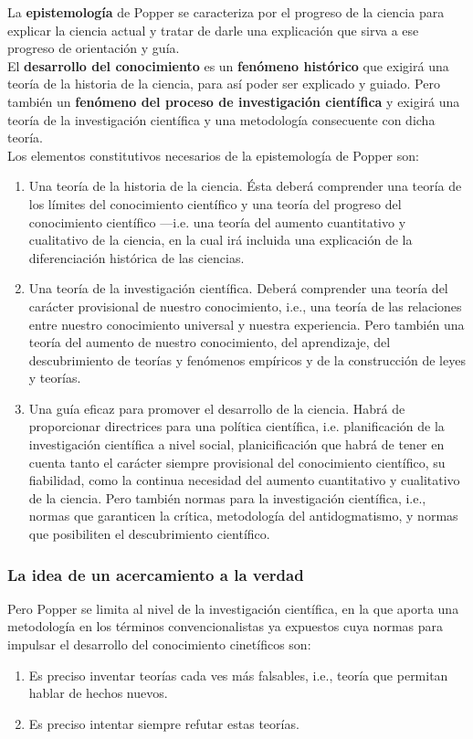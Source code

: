 \documentclass[a4paper, 11pt, twocolumn, spanish]{article}
\begin{document}
La \textbf{epistemología} de Popper se caracteriza por el progreso de la
ciencia para explicar la ciencia actual y tratar de darle una
explicación que sirva a ese progreso de orientación y guía. \\[0pt]
El \textbf{desarrollo del conocimiento} es un \textbf{fenómeno histórico} que
exigirá una teoría de la historia de la ciencia, para así poder ser
explicado y guiado. Pero también un \textbf{fenómeno del proceso de
investigación científica} y exigirá una teoría de la investigación
científica y una metodología consecuente con dicha teoría.\\[0pt]
Los elementos constitutivos necesarios de la epistemología de Popper
son:
\begin{enumerate}
\item Una teoría de la historia de la ciencia. Ésta deberá comprender
una teoría de los límites del conocimiento científico y una
teoría del progreso del conocimiento científico —i.e. una teoría
del aumento cuantitativo y cualitativo de la ciencia, en la cual
irá incluida una explicación de la diferenciación histórica de las
ciencias.
\item Una teoría de la investigación científica. Deberá comprender una
teoría del carácter provisional de nuestro conocimiento, i.e.,
una teoría de las relaciones entre nuestro conocimiento universal
y nuestra experiencia. Pero también una teoría del aumento de
nuestro conocimiento, del aprendizaje, del descubrimiento de
teorías y fenómenos empíricos y de la construcción de leyes y
teorías.
\item Una guía eficaz para promover el desarrollo de la ciencia. Habrá
de proporcionar directrices para una política científica, i.e.
planificación de la investigación científica a nivel social,
planicificación que habrá de tener en cuenta tanto el carácter
siempre provisional del conocimiento científico, su fiabilidad,
como la continua necesidad del aumento cuantitativo y cualitativo
de la ciencia. Pero también normas para la investigación
científica, i.e., normas que garanticen la crítica, metodología
del antidogmatismo, y normas que posibiliten el descubrimiento
científico.
\end{enumerate}

\subsubsection{La idea de un acercamiento a la verdad}
\label{sec:org01553b3}
Pero Popper se limita al nivel de la investigación científica, en la
que aporta una metodología en los términos convencionalistas ya
expuestos cuya normas para impulsar el desarrollo del conocimiento
cinetíficos son:
\begin{enumerate}
\item Es preciso inventar teorías cada ves más falsables, i.e., teoría
que permitan hablar de hechos nuevos.
\item Es preciso intentar siempre refutar estas teorías.
\end{enumerate}
\end{document}
